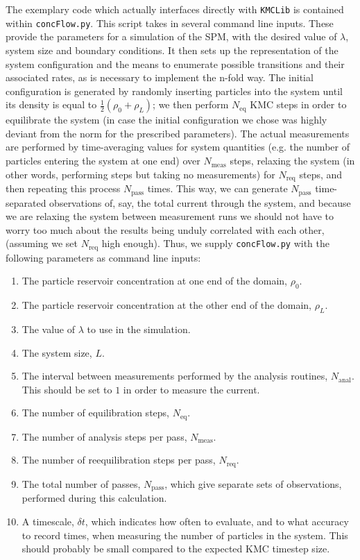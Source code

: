 The exemplary code which actually interfaces directly with \texttt{KMCLib} is contained within 
\texttt{concFlow.py}. This script takes in several command line inputs. These provide the parameters for
a simulation of the SPM, with the desired value of $\lambda$, system size and boundary conditions. It 
then sets up the representation of the system configuration and the means to enumerate possible
transitions and their associated rates, as is necessary to implement the n-fold way.
The initial configuration is generated by randomly inserting particles into the system until its density
is equal to $\frac{1}{2}\left(\rho_0 + \rho_L \right)$; we then perform $N_{\mathrm{eq}}$ KMC steps in order to 
equilibrate the system (in case the initial configuration we chose was highly deviant from the norm
for the prescribed parameters). The actual measurements are performed by time-averaging values for system
quantities (e.g. the number of particles entering the system at one end) over $N_{\mathrm{meas}}$ steps,
relaxing the system (in other words, performing steps but taking no measurements) for $N_{\mathrm{req}}$ steps,
and then repeating this process $N_{\mathrm{pass}}$ times. This way, we can generate $N_{\mathrm{pass}}$ time-separated 
observations of, say, the total current through the system, and because we are relaxing the system 
between measurement runs we should not have to worry too much about the results being unduly correlated
with each other, (assuming we set $N_{\mathrm{req}}$ high enough).
Thus, we supply \texttt{concFlow.py} with the following parameters as 
command line inputs:
\begin{enumerate}
 \item The particle reservoir concentration at one end of the domain, $\rho_0$.
 \item The particle reservoir concentration at the other end of the domain, $\rho_L$.
 \item The value of $\lambda$ to use in the simulation.
 \item The system size, $L$.
 \item The interval between measurements performed by the analysis
 routines, $N_{\mathrm{anal}}$. This should be set to $1$ in order to measure the current.
 \item The number of equilibration steps, $N_{\mathrm{eq}}$.
 \item The number of analysis steps per pass, $N_{\mathrm{meas}}$.
 \item The number of reequilibration steps per pass, $N_{\mathrm{req}}$.
 \item The total number of passes, $N_{\mathrm{pass}}$, which give separate
 sets of observations, performed during this calculation.
 \item A timescale, $\delta t$, which indicates how often to evaluate,
 and to what accuracy to record times, when measuring the number of 
 particles in the system. This should probably be small compared to the expected KMC timestep size.
\end{enumerate}


